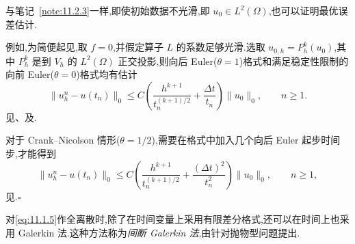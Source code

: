 \begin{note}
与笔记~\ref{note:11.2.3}一样,即使初始数据不光滑,即 \(u_0\in L^2(\Omega)\),也可以证明最优误差估计.

例如,为简便起见,取 \(f=0\),并假定算子 \(L\) 的系数足够光滑.选取 \(u_{0,h}=P_h^k(u_0)\),其中 \(P_h^k\) 是到 \(V_h\) 的 \(L^2(\Omega)\) 正交投影,则向后 Euler(\(\theta=1\))格式和满足稳定性限制的向前 Euler(\(\theta=0\))格式均有估计
\begin{equation}\label{eq:11.3.38}
  \|u_h^n-u(t_n)\|_0
     \le C\left(\frac{h^{k+1}}{t_n^{(k+1)/2}}+\frac{\Delta t}{t_n}\right)\|u_0\|_0,\qquad n\ge1.
\end{equation}
见、及.

对于 Crank--Nicolson 情形(\(\theta=1/2\)),需要在格式中加入几个向后 Euler 起步时间步,才能得到
\begin{equation}\label{eq:11.3.39}
  \|u_h^n-u(t_n)\|_0
     \le C\left(\frac{h^{k+1}}{t_n^{(k+1)/2}}+\frac{(\Delta t)^2}{t_n^2}\right)\|u_0\|_0,\qquad n\ge1,
\end{equation}
见.\hfill\(\square\)
\end{note}

对\eqref{eq:11.1.5}作全离散时,除了在时间变量上采用有限差分格式,还可以在时间上也采用 Galerkin 法.这种方法称为\emph{间断 Galerkin 法},由针对抛物型问题提出.

